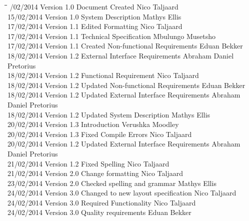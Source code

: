 \documentclass[12pt]{article}
\begin{document}
		\begin{tabbing}
			\hspace*{2.5cm}\=\hspace*{2.5cm}\=\hspace*{8cm}\=\hspace*{3cm} /02/2014	\> Version 1.0	\> Document Created 							\> Nico Taljaard \\
			15/02/2014	\> Version 1.0	\> System Description 							\> Mathys Ellis \\
			17/02/2014	\> Version 1.1	\> Edited Formatting 							\> Nico Taljaard \\
			17/02/2014	\> Version 1.1	\> Technical Specification 						\> Mbulungo Musetsho \\
			17/02/2014	\> Version 1.1	\> Created Non-functional Requirements 			\> Eduan Bekker \\
			18/02/2014	\> Version 1.2	\> External Interface Requirements 				\> Abraham Daniel Pretorius  \\
			18/02/2014	\> Version 1.2	\> Functional Requirement 						\> Nico Taljaard \\
			18/02/2014	\> Version 1.2	\> Updated Non-functional Requirements 			\> Eduan Bekker \\
			18/02/2014	\> Version 1.2	\> Updated External Interface Requirements 		\> Abraham Daniel Pretorius  \\
			18/02/2014	\> Version 1.2	\> Updated System Description 					\> Mathys Ellis \\
			20/02/2014	\> Version 1.3	\> Introduction 								\> Verushka Moodley \\
			20/02/2014	\> Version 1.3	\> Fixed Compile Errors 						\> Nico Taljaard \\
			20/02/2014	\> Version 1.2	\> Updated External Interface Requirements 		\> Abraham Daniel Pretorius  \\
			21/02/2014	\> Version 1.2	\> Fixed Spelling 								\> Nico Taljaard \\
			21/02/2014	\> Version 2.0	\> Change formatting 							\> Nico Taljaard \\
			23/02/2014	\> Version 2.0	\> Checked spelling and grammar 				\> Mathys Ellis \\
			24/02/2014	\> Version 3.0	\> Changed to new layout specification 			\> Nico Taljaard \\
			24/02/2014	\> Version 3.0	\> Required Functionality 						\> Nico Taljaard \\
			24/02/2014	\> Version 3.0	\> Quality requirements 						\> Eduan Bekker \\

\end{tabbing}
\end{document}
